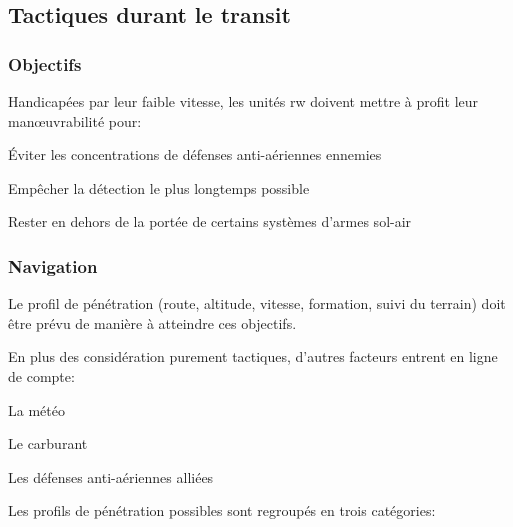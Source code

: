 \subsection{Tactiques durant le transit}

\subsubsection{Objectifs}

\e
    \item Handicapées par leur faible vitesse, les unités \gls{rw} doivent mettre à profit leur manœuvrabilité pour:
    \ee
        \item Éviter les concentrations de défenses anti-aériennes ennemies
        \item Empêcher la détection le plus longtemps possible
        \item Rester en dehors de la portée de certains systèmes d'armes sol-air
    \ed
\ed

\subsubsection{Navigation}

\e
    \item Le profil de pénétration (route, altitude, vitesse, formation, suivi du terrain) doit être prévu de manière à atteindre ces objectifs.
    \item En plus des considération purement tactiques, d'autres facteurs entrent en ligne de compte:
    \ee
        \item La météo
        \item Le carburant
        \item Les défenses anti-aériennes alliées
    \ed
    \item Les profils de pénétration possibles sont regroupés en trois catégories:


